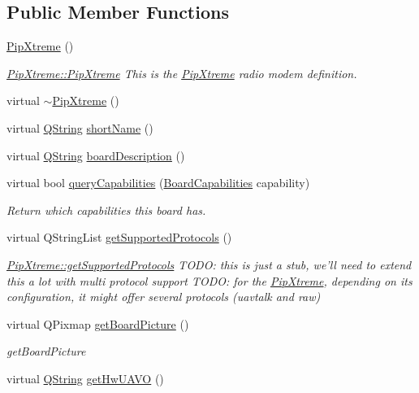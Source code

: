 \subsection*{Public Member Functions}
\begin{DoxyCompactItemize}
\item 
\hyperlink{group___boards___open_pilot_plugin_ga933d096d4ca64fb4d20fc5501d21fe24}{Pip\-Xtreme} ()
\begin{DoxyCompactList}\small\item\em \hyperlink{group___boards___open_pilot_plugin_ga933d096d4ca64fb4d20fc5501d21fe24}{Pip\-Xtreme\-::\-Pip\-Xtreme} This is the \hyperlink{class_pip_xtreme}{Pip\-Xtreme} radio modem definition. \end{DoxyCompactList}\item 
virtual \hyperlink{group___boards___open_pilot_plugin_ga6a493453ee4e734933fca8caf5b92b7c}{$\sim$\-Pip\-Xtreme} ()
\item 
virtual \hyperlink{group___u_a_v_objects_plugin_gab9d252f49c333c94a72f97ce3105a32d}{Q\-String} \hyperlink{group___boards___open_pilot_plugin_ga3267a634ade3947a6463a2aaae145c1b}{short\-Name} ()
\item 
virtual \hyperlink{group___u_a_v_objects_plugin_gab9d252f49c333c94a72f97ce3105a32d}{Q\-String} \hyperlink{group___boards___open_pilot_plugin_ga31e2251cfd285fe24c515d5ee2e53062}{board\-Description} ()
\item 
virtual bool \hyperlink{group___boards___open_pilot_plugin_ga4cb0d73f85ef11bb262d9d0a94c7b033}{query\-Capabilities} (\hyperlink{group___core_plugin_ga01b09218f2a13aaeee6db007ac6bd967}{Board\-Capabilities} capability)
\begin{DoxyCompactList}\small\item\em Return which capabilities this board has. \end{DoxyCompactList}\item 
virtual Q\-String\-List \hyperlink{group___boards___open_pilot_plugin_gac32d0b331396845ce602cc74ff751d83}{get\-Supported\-Protocols} ()
\begin{DoxyCompactList}\small\item\em \hyperlink{group___boards___open_pilot_plugin_gac32d0b331396845ce602cc74ff751d83}{Pip\-Xtreme\-::get\-Supported\-Protocols} T\-O\-D\-O\-: this is just a stub, we'll need to extend this a lot with multi protocol support T\-O\-D\-O\-: for the \hyperlink{class_pip_xtreme}{Pip\-Xtreme}, depending on its configuration, it might offer several protocols (uavtalk and raw) \end{DoxyCompactList}\item 
virtual Q\-Pixmap \hyperlink{group___boards___open_pilot_plugin_gabfd6ccc67c330f1ffdcfdac97cc864f9}{get\-Board\-Picture} ()
\begin{DoxyCompactList}\small\item\em get\-Board\-Picture \end{DoxyCompactList}\item 
virtual \hyperlink{group___u_a_v_objects_plugin_gab9d252f49c333c94a72f97ce3105a32d}{Q\-String} \hyperlink{group___boards___open_pilot_plugin_gad8bc1cdc90506b5549224c5c40b835ce}{get\-Hw\-U\-A\-V\-O} ()
\end{DoxyCompactItemize}
